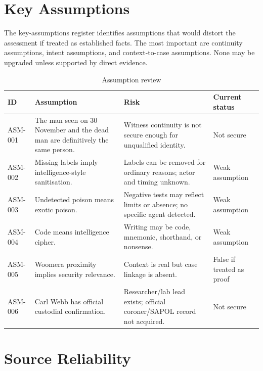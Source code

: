 \section{Key Assumptions}

The key-assumptions register identifies assumptions that would distort the assessment if treated as established facts. The most important are continuity assumptions, intent assumptions, and context-to-case assumptions. None may be upgraded unless supported by direct evidence.

\begin{table}[htbp]
\centering
\caption{Assumption review}
\label{tab:chapter10-assumption-review}
\scriptsize
\setlength{\tabcolsep}{2pt}
\renewcommand{\arraystretch}{1.12}
\begin{tabularx}{\textwidth}{>{\raggedright\arraybackslash}p{}>{\raggedright\arraybackslash}p{}>{\raggedright\arraybackslash}p{}>{\raggedright\arraybackslash}X}
\toprule
ID & Assumption & Risk & Current status \\
\midrule
ASM-001 & The man seen on 30 November and the dead man are definitively the same person. & Witness continuity is not secure enough for unqualified identity. & Not secure \\
ASM-002 & Missing labels imply intelligence-style sanitisation. & Labels can be removed for ordinary reasons; actor and timing unknown. & Weak assumption \\
ASM-003 & Undetected poison means exotic poison. & Negative tests may reflect limits or absence; no specific agent detected. & Weak assumption \\
ASM-004 & Code means intelligence cipher. & Writing may be code, mnemonic, shorthand, or nonsense. & Weak assumption \\
ASM-005 & Woomera proximity implies security relevance. & Context is real but case linkage is absent. & False if treated as proof \\
ASM-006 & Carl Webb has official custodial confirmation. & Researcher/lab lead exists; official coroner/SAPOL record not acquired. & Not secure \\
\bottomrule
\end{tabularx}
\end{table}

\section{Source Reliability}

